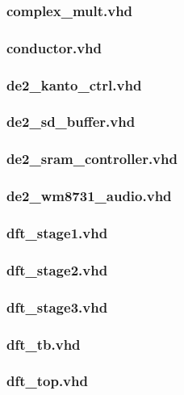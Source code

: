 \documentclass{article}
\begin{document}
	\subsubsection{complex\_mult.vhd}
	
	\subsubsection{conductor.vhd}
	
	\subsubsection{de2\_kanto\_ctrl.vhd}
	
	\subsubsection{de2\_sd\_buffer.vhd}
	
	\subsubsection{de2\_sram\_controller.vhd}
	
	\subsubsection{de2\_wm8731\_audio.vhd}
	
	\subsubsection{dft\_stage1.vhd}
	
	\subsubsection{dft\_stage2.vhd}
	
	\subsubsection{dft\_stage3.vhd}
	
	\subsubsection{dft\_tb.vhd}
	
	\subsubsection{dft\_top.vhd}
	
\end{document}
